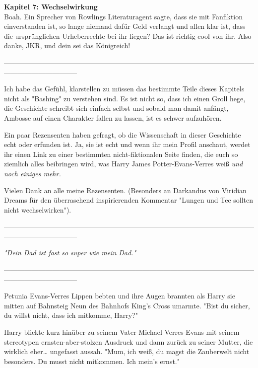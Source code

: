

\hypertarget{wechselwirkung}{%

\textbf{Kapitel 7: Wechselwirkung}\\

Boah. Ein Sprecher von Rowlings Literaturagent sagte, dass sie mit Fanfiktion einverstanden ist, so lange niemand dafür Geld verlangt und allen klar ist, dass die ursprünglichen Urheberrechte bei ihr liegen? Das ist richtig cool von ihr. Also danke, JKR, und dein sei das Königreich!

--------------------------------------------------------------------------------------------------------------------------------------------

Ich habe das Gefühl, klarstellen zu müssen das bestimmte Teile dieses Kapitels nicht als "Bashing" zu verstehen sind. Es ist nicht so, dass ich einen Groll hege, die Geschichte schreibt sich einfach selbst und sobald man damit anfängt, Ambosse auf einen Charakter fallen zu lassen, ist es schwer aufzuhören.

Ein paar Rezensenten haben gefragt, ob die Wissenschaft in dieser Geschichte echt oder erfunden ist. Ja, sie ist echt und wenn ihr mein Profil anschaut, werdet ihr einen Link zu einer bestimmten nicht-fiktionalen Seite finden, die euch so ziemlich alles beibringen wird, was Harry James Potter-Evans-Verres weiß \emph{und noch einiges mehr.}

Vielen Dank an alle meine Rezensenten. (Besonders an Darkandus von Viridian Dreams für den überraschend inspirierenden Kommentar "Lungen und Tee sollten nicht wechselwirken").

--------------------------------------------------------------------------------------------------------------------------------------------

\emph{\emph{"Dein Dad ist fast so super wie mein Dad."}}

--------------------------------------------------------------------------------------------------------------------------------------------

Petunia Evans-Verres Lippen bebten und ihre Augen brannten als Harry sie mitten auf Bahnsteig Neun des Bahnhofs King's Cross umarmte. "Bist du sicher, du willst nicht, dass ich mitkomme, Harry?"

Harry blickte kurz hinüber zu seinem Vater Michael Verres-Evans mit seinem stereotypen ernsten-aber-stolzen Ausdruck und dann zurück zu seiner Mutter, die wirklich eher… ungefasst aussah. "Mum, ich weiß, du magst die Zauberwelt nicht besonders. Du musst nicht mitkommen. Ich mein's ernst."

}
